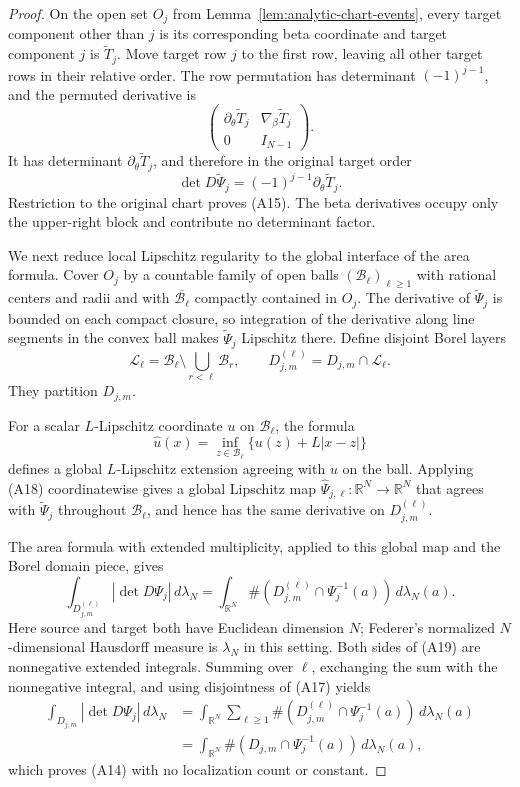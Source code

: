 \begin{proof}
On the open set $O_j$ from Lemma~\ref{lem:analytic-chart-events}, every
target component other than $j$ is its corresponding beta coordinate and
target component $j$ is $\widetilde T_j$.  Move target row $j$ to the first
row, leaving all other target rows in their relative order.  The row
permutation has determinant $(-1)^{j-1}$, and the permuted derivative is
\[
\begin{pmatrix}
\partial_\theta\widetilde T_j&\nabla_\beta\widetilde T_j\\
0&I_{N-1}
\end{pmatrix}.
\]
It has determinant $\partial_\theta\widetilde T_j$, and therefore in the
original target order
\[
\det D\widetilde\Psi_j
=(-1)^{j-1}\partial_\theta\widetilde T_j.
\]
Restriction to the original chart proves \textup{(A15)}.  The beta
derivatives occupy only the upper-right block and contribute no determinant
factor.

We next reduce local Lipschitz regularity to the global interface of the
area formula.  Cover $O_j$ by a countable family of open balls
$(\mathcal B_\ell)_{\ell\geq1}$ with rational centers and radii and with
$\overline{\mathcal B_\ell}$ compactly contained in $O_j$.  The derivative
of $\widetilde\Psi_j$ is bounded on each compact closure, so integration of
the derivative along line segments in the convex ball makes
$\widetilde\Psi_j$ Lipschitz there.  Define disjoint Borel layers
\[
\mathcal L_\ell
=\mathcal B_\ell\setminus\bigcup_{r<\ell}\mathcal B_r,
\qquad
D_{j,m}^{(\ell)}=D_{j,m}\cap\mathcal L_\ell.
\tag{A17}
\]
They partition $D_{j,m}$.

For a scalar $L$-Lipschitz coordinate $u$ on $\mathcal B_\ell$, the formula
\[
\widehat u(x)=\inf_{z\in\mathcal B_\ell}
\{u(z)+L|x-z|\}
\tag{A18}
\]
defines a global $L$-Lipschitz extension agreeing with $u$ on the ball.
Applying \textup{(A18)} coordinatewise gives a global Lipschitz map
$\widehat\Psi_{j,\ell}:\mathbb R^N\to\mathbb R^N$ that agrees with
$\widetilde\Psi_j$ throughout $\mathcal B_\ell$, and hence has the same
derivative on $D_{j,m}^{(\ell)}$.

The area formula with extended multiplicity, applied to this global map and
the Borel domain piece, gives
\citep[Section~3.2.3, p.~243]{Federer1969}
\[
\int_{D_{j,m}^{(\ell)}}|\det D\Psi_j|\,d\lambda_N
=\int_{\mathbb R^N}
\#(D_{j,m}^{(\ell)}\cap\Psi_j^{-1}(a))\,d\lambda_N(a).
\tag{A19}
\]
Here source and target both have Euclidean dimension $N$; Federer's
normalized $N$-dimensional Hausdorff measure is $\lambda_N$ in this
setting.  Both sides of \textup{(A19)} are nonnegative extended integrals.
Summing over $\ell$, exchanging the sum with the nonnegative integral, and
using disjointness of \textup{(A17)} yields
\[
\begin{aligned}
\int_{D_{j,m}}|\det D\Psi_j|\,d\lambda_N
&=\int_{\mathbb R^N}\sum_{\ell\geq1}
 \#(D_{j,m}^{(\ell)}\cap\Psi_j^{-1}(a))\,d\lambda_N(a)\\
&=\int_{\mathbb R^N}
 \#(D_{j,m}\cap\Psi_j^{-1}(a))\,d\lambda_N(a),
\end{aligned}
\]
which proves \textup{(A14)} with no localization count or constant.


\end{proof}
